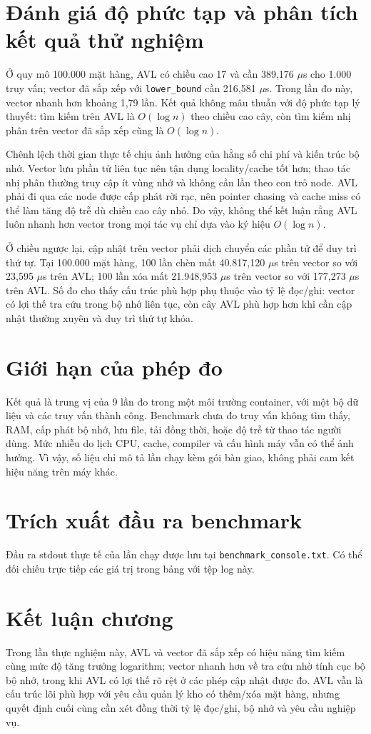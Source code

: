 \section{Đánh giá độ phức tạp và phân tích kết quả thử nghiệm}
Ở quy mô 100.000 mặt hàng, AVL có chiều cao 17 và cần 389,176 $\mu$s cho 1.000 truy vấn; vector đã sắp xếp với \texttt{lower\_bound} cần 216,581 $\mu$s. Trong lần đo này, vector nhanh hơn khoảng 1,79 lần. Kết quả không mâu thuẫn với độ phức tạp lý thuyết: tìm kiếm trên AVL là $O(\log n)$ theo chiều cao cây, còn tìm kiếm nhị phân trên vector đã sắp xếp cũng là $O(\log n)$.

Chênh lệch thời gian thực tế chịu ảnh hưởng của hằng số chi phí và kiến trúc bộ nhớ. Vector lưu phần tử liên tục nên tận dụng locality/cache tốt hơn; thao tác nhị phân thường truy cập ít vùng nhớ và không cần lần theo con trỏ node. AVL phải đi qua các node được cấp phát rời rạc, nên pointer chasing và cache miss có thể làm tăng độ trễ dù chiều cao cây nhỏ. Do vậy, không thể kết luận rằng AVL luôn nhanh hơn vector trong mọi tác vụ chỉ dựa vào ký hiệu $O(\log n)$.

Ở chiều ngược lại, cập nhật trên vector phải dịch chuyển các phần tử để duy trì thứ tự. Tại 100.000 mặt hàng, 100 lần chèn mất 40.817,120 $\mu$s trên vector so với 23,595 $\mu$s trên AVL; 100 lần xóa mất 21.948,953 $\mu$s trên vector so với 177,273 $\mu$s trên AVL. Số đo cho thấy cấu trúc phù hợp phụ thuộc vào tỷ lệ đọc/ghi: vector có lợi thế tra cứu trong bộ nhớ liên tục, còn cây AVL phù hợp hơn khi cần cập nhật thường xuyên và duy trì thứ tự khóa.

\section{Giới hạn của phép đo}
Kết quả là trung vị của 9 lần đo trong một môi trường container, với một bộ dữ liệu và các truy vấn thành công. Benchmark chưa đo truy vấn không tìm thấy, RAM, cấp phát bộ nhớ, lưu file, tải đồng thời, hoặc độ trễ từ thao tác người dùng. Mức nhiễu do lịch CPU, cache, compiler và cấu hình máy vẫn có thể ảnh hưởng. Vì vậy, số liệu chỉ mô tả lần chạy kèm gói bàn giao, không phải cam kết hiệu năng trên máy khác.

\section{Trích xuất đầu ra benchmark}
Đầu ra stdout thực tế của lần chạy được lưu tại \texttt{benchmark\_console.txt}. Có thể đối chiếu trực tiếp các giá trị trong bảng với tệp log này.


\section{Kết luận chương}
Trong lần thực nghiệm này, AVL và vector đã sắp xếp có hiệu năng tìm kiếm cùng mức độ tăng trưởng logarithm; vector nhanh hơn về tra cứu nhờ tính cục bộ bộ nhớ, trong khi AVL có lợi thế rõ rệt ở các phép cập nhật được đo. AVL vẫn là cấu trúc lõi phù hợp với yêu cầu quản lý kho có thêm/xóa mặt hàng, nhưng quyết định cuối cùng cần xét đồng thời tỷ lệ đọc/ghi, bộ nhớ và yêu cầu nghiệp vụ.
